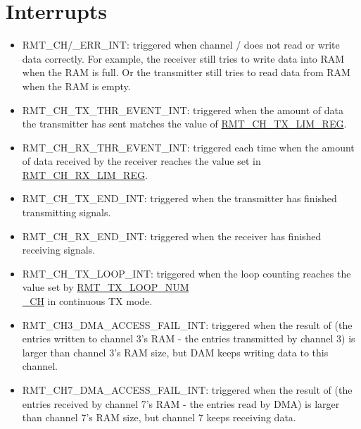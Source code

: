 \documentclass[main\_\_EN.tex]{subfiles}
\begin{document}
\section{Interrupts}
\begin{itemize}
\item \label{int:RMTCHnERRINT}RMT\_CH/\_ERR\_INT: triggered when channel / does not read or write data correctly. For example, the receiver still tries to write data into RAM when the RAM is full. Or the transmitter still tries to read data from RAM when the RAM is empty.
\item \label{int:RMTCHnTXTHREVENTINT}RMT\_CH\_TX\_THR\_EVENT\_INT: triggered when the amount of data the transmitter has sent matches the value of  \hyperref[regdesc:RMTCHNTXLIMREG]{RMT\_CH\_TX\_LIM\_REG}.
\item \label{int:RMTCHmRXTHREVENTINT}RMT\_CH\_RX\_THR\_EVENT\_INT: triggered each time when the amount of data received by the receiver reaches the value set in \hyperref[fielddesc:RMTCHMRXLIMREG]{RMT\_CH\_RX\_LIM\_REG}.
\item \label{int:RMTCHnTXENDINT}RMT\_CH\_TX\_END\_INT: triggered when the transmitter has finished transmitting signals.
\item \label{int:RMTCHnRXENDINT}RMT\_CH\_RX\_END\_INT: triggered when the receiver has finished receiving signals.
\item \label{int:RMTCHnTXLOOPINT}RMT\_CH\_TX\_LOOP\_INT: triggered when the loop counting reaches the value set by  \hyperref[fielddesc:RMTTXLOOPNUMCHN]{RMT\_TX\_LOOP\_NUM\\\_CH} in continuous TX mode.
\item RMT\_CH3\_DMA\_ACCESS\_FAIL\_INT: triggered when the result of (the entries written to channel 3's RAM - the entries transmitted by channel 3) is larger than channel 3's RAM size, but DAM keeps writing data to this channel.
\item RMT\_CH7\_DMA\_ACCESS\_FAIL\_INT: triggered when the result of (the entries received by channel 7's RAM - the entries read by DMA) is larger than channel 7's RAM size, but channel 7 keeps receiving data.
\end{itemize}


\end{document}
